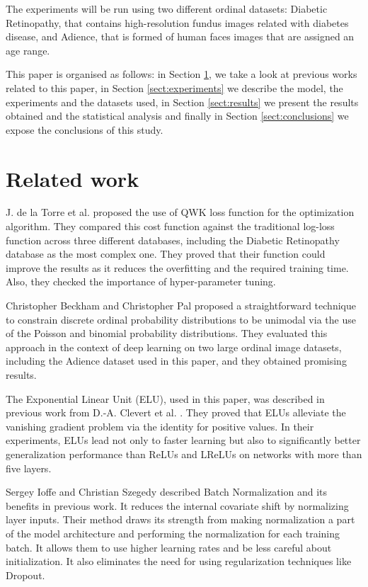 \documentclass[10pt, a4paper, titlepage, twocolumn]{article}
\begin{document}
	The experiments will be run using two different ordinal datasets: Diabetic Retinopathy, that contains high-resolution fundus images related with diabetes disease, and Adience, that is formed of human faces images that are assigned an age range.
	
	This paper is organised as follows: in Section \ref{sect:relatedwork}, we take a look at previous works related to this paper, in Section \ref{sect:experiments} we describe the model, the experiments and the datasets used, in Section \ref{sect:results} we present the results obtained and the statistical analysis and finally in Section \ref{sect:conclusions} we expose the conclusions of this study.
	
	\section{Related work}
	\label{sect:relatedwork}
	J. de la Torre et al. \cite{de2018weighted} proposed the use of QWK loss function for the optimization algorithm. They compared this cost function against the traditional log-loss function across three different databases, including the Diabetic Retinopathy database as the most complex one. They proved that their function could improve the results as it reduces the overfitting and the required training time. Also, they checked the importance of hyper-parameter tuning.

	Christopher Beckham and Christopher Pal \cite{beckham2017unimodal} proposed a straightforward technique to constrain discrete ordinal probability distributions to be unimodal via the use of the Poisson and binomial probability distributions. They evaluated this approach in the context of deep learning on two large ordinal image datasets, including the Adience dataset used in this paper, and they obtained promising results.
	
	The Exponential Linear Unit (ELU), used in this paper, was described in previous work from D.-A. Clevert et al. \cite{clevert2015fast}. They proved that ELUs alleviate the vanishing gradient problem via the identity for positive values. In their experiments, ELUs lead not only to faster learning but also to significantly better generalization performance than ReLUs and LReLUs on networks with more than five layers.
	
	Sergey Ioffe and Christian Szegedy \cite{ioffe2015batch} described Batch Normalization and its benefits in previous work. It reduces the internal covariate shift by normalizing layer inputs. Their method draws its strength from making normalization a part of the model architecture and performing the normalization for each training batch. It allows them to use higher learning rates and be less careful about initialization. It also eliminates the need for using regularization techniques like Dropout.
	
\end{document}
